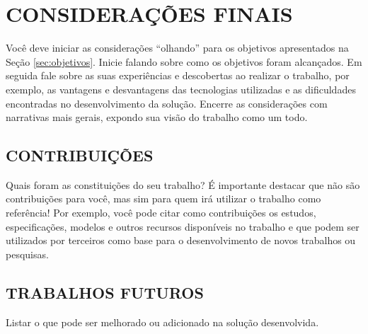 \chapter{CONSIDERAÇÕES FINAIS} \label{cap:consideracoes}

Você deve iniciar as considerações “olhando” para os objetivos apresentados na Seção \ref{sec:objetivos}. Inicie falando sobre como os objetivos foram alcançados.
Em seguida fale sobre as suas experiências e descobertas ao realizar o trabalho, por exemplo, as vantagens e desvantagens das tecnologias utilizadas e as dificuldades encontradas no desenvolvimento da solução.
Encerre as considerações com narrativas mais gerais, expondo sua visão do trabalho como um todo.

\section{CONTRIBUIÇÕES} 

Quais foram as constituições do seu trabalho? É importante destacar que não são contribuições para você, mas sim para quem irá utilizar o trabalho como referência! Por exemplo, você pode citar como contribuições os estudos, especificações, modelos e outros recursos disponíveis no trabalho e que podem ser utilizados por terceiros como base para o desenvolvimento de novos trabalhos ou pesquisas.

\section{TRABALHOS FUTUROS} 

Listar o que pode ser melhorado ou adicionado na solução desenvolvida.


